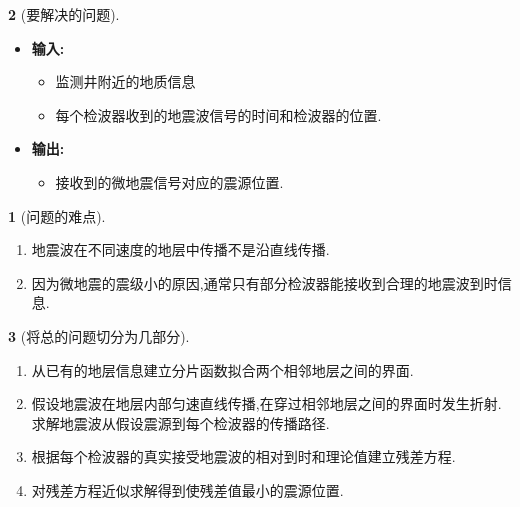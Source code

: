 \documentclass[UTF8]{ctexbeamer}	%
\theoremstyle{plain}
\theoremstyle{definition}
\newtheorem{emt}{}[section]
\theoremstyle{remark}
\numberwithin{equation}{section}
\begin{document}
\begin{frame}

  \begin{emt}[要解决的问题]
    \begin{itemize}
        \item \textbf{输入: }
        \begin{itemize}
            \item 监测井附近的地质信息
            \item 每个检波器收到的地震波信号的时间和检波器的位置.
        \end{itemize} 
        \item \textbf{输出: } 
        \begin{itemize}
            \item 接收到的微地震信号对应的震源位置. 
        \end{itemize}
    \end{itemize}

    \begin{emt}[问题的难点]
        \begin{enumerate}
            \item 地震波在不同速度的地层中传播不是沿直线传播.

            \item 因为微地震的震级小的原因,通常只有部分检波器能接收到合理的地震波到时信息.
            
        \end{enumerate}
        
    \end{emt}
      
  \end{emt}
\end{frame}






\begin{frame}
  \begin{emt}[将总的问题切分为几部分]
    \begin{enumerate}
        \item 从已有的地层信息建立分片函数拟合两个相邻地层之间的界面.
        \item 假设地震波在地层内部匀速直线传播,在穿过相邻地层之间的界面时发生折射.
        求解地震波从假设震源到每个检波器的传播路径.
        \item 
        根据每个检波器的真实接受地震波的相对到时和理论值建立残差方程.
        \item 对残差方程近似求解得到使残差值最小的震源位置.
    \end{enumerate}
  \end{emt}
\end{frame}
\end{document}
